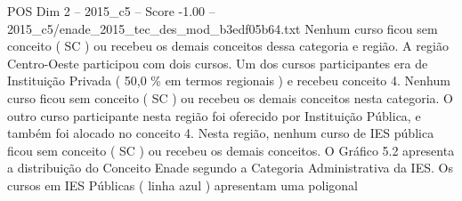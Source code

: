 \begin{textsample}{POS Dim 2 – 2015\_c5 – Score -1.00 – 2015\_c5/enade\_2015\_tec\_des\_mod\_b3edf05b64.txt}
Nenhum curso ficou sem conceito ( SC ) ou recebeu os demais conceitos dessa categoria e região.
A região Centro-Oeste participou com dois cursos.
Um dos cursos participantes era de Instituição Privada ( 50,0 \% em termos regionais ) e recebeu conceito 4.
Nenhum curso ficou sem conceito ( SC ) ou recebeu os demais conceitos nesta categoria.
O outro curso participante nesta região foi oferecido por Instituição Pública, e também foi alocado no conceito 4.
Nesta região, nenhum curso de IES pública ficou sem conceito ( SC ) ou recebeu os demais conceitos.
O Gráfico 5.2 apresenta a distribuição do Conceito Enade segundo a Categoria Administrativa da IES.
Os cursos em IES Públicas ( linha azul ) apresentam uma poligonal

\end{textsample}
